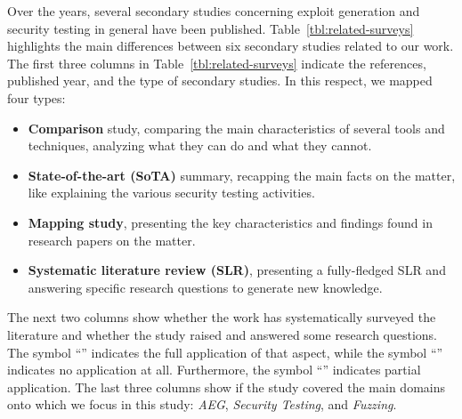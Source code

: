 Over the years, several secondary studies concerning exploit generation and security testing in general have been published.
%
Table~\ref{tbl:related-surveys} highlights the main differences between six secondary studies related to our work. The first three columns in Table~\ref{tbl:related-surveys} indicate the references, published year, and the type of secondary studies.
In this respect, we mapped four types:
\begin{itemize}
    \item \textbf{Comparison} study, comparing the main characteristics of several tools and techniques, analyzing what they can do and what they cannot.
    \item \textbf{State-of-the-art (SoTA)} summary, recapping the main facts on the matter, like explaining the various security testing activities.
    \item \textbf{Mapping study}, presenting the key characteristics and findings found in research papers on the matter.
    \item \textbf{Systematic literature review (SLR)}, presenting a fully-fledged SLR and answering specific research questions to generate new knowledge.
\end{itemize}



The next two columns show whether the work has systematically surveyed the literature and whether the study raised and answered some research questions.
The symbol ``'' indicates the full application of that aspect, while the symbol ``'' indicates no application at all.
Furthermore, the symbol ``'' indicates partial application.
The last three columns show if the study covered the main domains onto which we focus in this study: \textit{AEG}, \textit{Security Testing}, and \textit{Fuzzing}.
{}
{}

